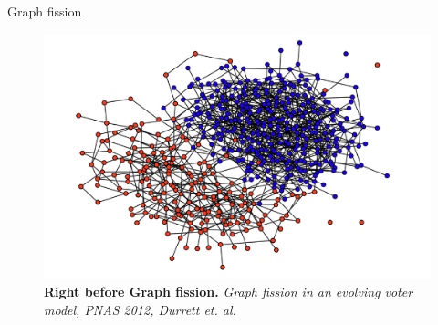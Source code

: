 \documentclass{beamer}
\begin{document}
\begin{frame}{Graph fission}
    \begin{figure}
        \centering
        \includegraphics[width = 0.8\linewidth]{figs/截屏2020-07-10 下午7.23.09.png}
        \caption{\textbf{Right before Graph fission.} \textit{Graph fission in an evolving voter model, PNAS 2012, Durrett et. al.}}
    \end{figure}
\end{frame}
\end{document}
